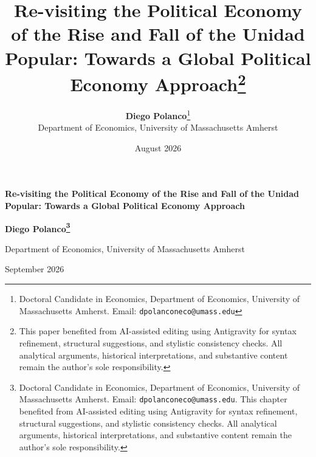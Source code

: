 \documentclass[11pt,a4paper]{article}
\title{\textbf{Re-visiting the Political Economy of the Rise and Fall of the Unidad Popular: Towards a Global Political Economy Approach}\thanks{This paper benefited from AI-assisted editing using Antigravity for syntax refinement, structural suggestions, and stylistic consistency checks. All analytical arguments, historical interpretations, and substantive content remain the author's sole responsibility.}}
\author{\textbf{Diego Polanco}\thanks{Doctoral Candidate in Economics, Department of Economics, University of Massachusetts Amherst. Email: \texttt{dpolanconeco@umass.edu}} \\ Department of Economics, University of Massachusetts Amherst}
\date{August 2026}
\begin{document}
\begin{titlepage}
\begin{center}
\vspace*{0.2cm}
{\LARGE\bfseries Re-visiting the Political Economy of the Rise and Fall of the Unidad Popular: Towards a Global Political Economy Approach\par}
\vspace{1.0em}
{\large\bfseries Diego Polanco\thanks{Doctoral Candidate in Economics, Department of Economics, University of Massachusetts Amherst. Email: \texttt{dpolanconeco@umass.edu}. This chapter benefited from AI-assisted editing using Antigravity for syntax refinement, structural suggestions, and stylistic consistency checks. All analytical arguments, historical interpretations, and substantive content remain the author's sole responsibility.}\par}
\vspace{0.3em}
{\normalsize Department of Economics, University of Massachusetts Amherst\par}
\vspace{0.5em}
{\normalsize September 2026\par}
\vspace{1.2em}
\end{center}


\end{titlepage}
\end{document}
